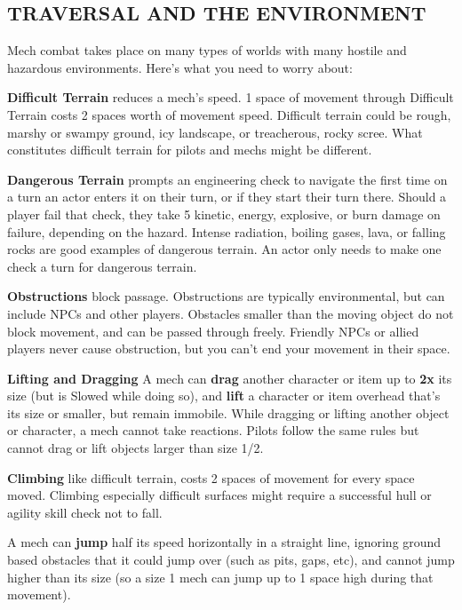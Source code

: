 \subsection{TRAVERSAL AND THE ENVIRONMENT}

Mech combat takes place on many types of worlds with many hostile and hazardous environments. Here’s what you need to worry about:


\textbf{Difficult Terrain} reduces a mech’s speed. 1 space of movement through Difficult Terrain costs 2 spaces worth of movement speed. Difficult terrain could be rough, marshy or swampy ground, icy landscape, or treacherous, rocky scree. What constitutes difficult terrain for pilots and mechs might be different.

\textbf{Dangerous Terrain} prompts an engineering check to navigate the first time on a turn an actor enters it on their turn, or if they start their turn there. Should a player fail that check, they take 5 kinetic, energy, explosive, or burn damage on failure, depending on the hazard. Intense radiation, boiling gases, lava, or falling rocks are good examples of dangerous terrain. An actor only needs to make one check a turn for dangerous terrain.

\textbf{Obstructions} block passage. Obstructions are typically environmental, but can include NPCs and other players. Obstacles smaller than the moving object do not block movement, and can be passed through freely. Friendly NPCs or allied players never cause obstruction, but you can’t end your movement in their space.


\textbf{Lifting and Dragging}
A mech can \textbf{drag} another character or item up to \textbf{2x} its size (but is Slowed while doing so), and \textbf{lift} a character or item overhead that’s its size or smaller, but remain immobile. While dragging or lifting another object or character, a mech cannot take reactions. Pilots follow the same rules but cannot drag or lift objects larger than size 1/2.

\textbf{Climbing} like difficult terrain, costs 2 spaces of movement for every space moved. Climbing especially difficult surfaces might require a successful hull or agility skill check not to fall.


A mech can \textbf{jump} half its speed horizontally in a straight line, ignoring ground based obstacles that it could jump over (such as pits, gaps, etc), and cannot jump higher than its size (so a size 1 mech can jump up to 1 space high during that movement).

